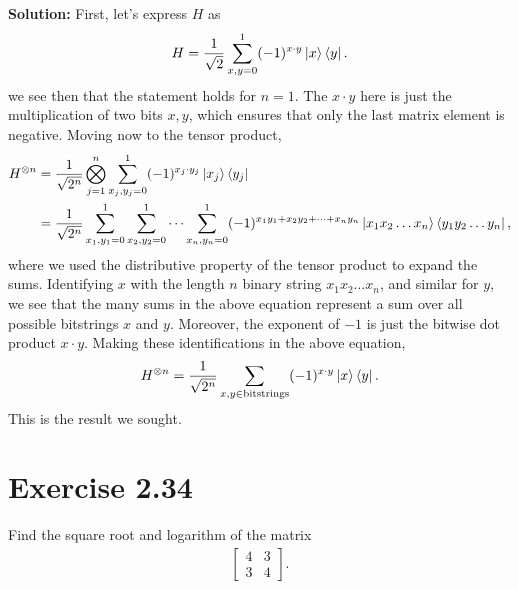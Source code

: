 \documentclass{book}
\begin{document}
    \textbf{Solution:} First, let's express $H$ as
    \begin{align}
        H = \frac{1}{\sqrt{2}}\sum_{x,y = 0}^1 (-1)^{x\cdot y} \ket{x}\bra{y}.
    \end{align}
    we see then that the statement holds for $n = 1$. The $x\cdot y$ here is just the multiplication of two bits $x, y$, which ensures that only the last matrix element is negative. Moving now to the tensor product,
    \begin{align}
        H^{\otimes n} &= \frac{1}{\sqrt{2^n}} \bigotimes_{j = 1}^n \sum_{x_j, y_j = 0}^1 (-1)^{x_j\cdot y_j} \ket{x_j}\bra{y_j} \\
        &= \frac{1}{\sqrt{2^n}} \sum_{x_1, y_1 = 0}^1 \sum_{x_2, y_2 = 0}^1 \dots \sum_{x_n, y_n = 0}^1 (-1)^{x_1 y_1 + x_2 y_2 + \dots + x_n y_n} \ket{x_1 x_2 \dots x_n} \bra{y_1 y_2 \dots y_n},
    \end{align}
    where we used the distributive property of the tensor product to expand the sums. Identifying $x$ with the length $n$ binary string $x_1 x_2 \dots x_n$, and similar for $y$, we see that the many sums in the above equation represent a sum over all possible bitstrings $x$ and $y$. Moreover, the exponent of $-1$ is just the bitwise dot product $x\cdot y$. Making these identifications in the above equation,
    \begin{align}
        H^{\otimes n} = \frac{1}{\sqrt{2^n}} \sum_{x,y \in \text{bitstrings}} (-1)^{x\cdot y} \ket{x}\bra{y}.
    \end{align}
    This is the result we sought. 
    
\section*{Exercise 2.34}
    Find the square root and logarithm of the matrix
    \begin{align}
    \begin{bmatrix}
        4 & 3 \\
        3 & 4
    \end{bmatrix}.
    \end{align}
    
\end{document}
